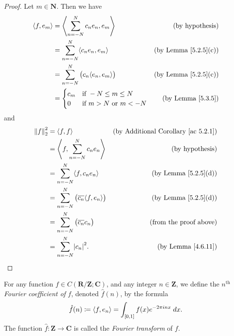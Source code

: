 \begin{proof}
    Let \(m \in \mathbf{N}\).
    Then we have
    \begin{align*}
        \inner*{f, e_m} & = \inner*{\sum_{n = -N}^N c_n e_n, e_m}           & \text{(by hypothesis)}           \\
                        & = \sum_{n = -N}^N \inner*{c_n e_n, e_m}           & \text{(by Lemma \ref{5.2.5}(c))} \\
                        & = \sum_{n = -N}^N \big(c_n \inner*{e_n, e_m}\big) & \text{(by Lemma \ref{5.2.5}(c))} \\
                        & = \begin{cases}
            c_m & \text{if } -N \leq m \leq N         \\
            0   & \text{if } m > N \text{ or } m < -N
        \end{cases}                      & \text{(by Lemma \ref{5.3.5})}
    \end{align*}
    and
    \begin{align*}
        \norm*{f}_2^2 & = \inner*{f, f}                                            & \text{(by Additional Corollary \ref{ac 5.2.1})} \\
                      & = \inner*{f, \sum_{n = -N}^N c_n e_n}                      & \text{(by hypothesis)}                          \\
                      & = \sum_{n = -N}^N \inner*{f, c_n e_n}                      & \text{(by Lemma \ref{5.2.5}(d))}                \\
                      & = \sum_{n = -N}^N \big(\overline{c_n} \inner*{f, e_n}\big) & \text{(by Lemma \ref{5.2.5}(d))}                \\
                      & = \sum_{n = -N}^N \big(\overline{c_n} c_n\big)             & \text{(from the proof above)}                   \\
                      & = \sum_{n = -N}^N \abs*{c_n}^2.                            & \text{(by Lemma \ref{4.6.11})}
    \end{align*}
\end{proof}

\begin{definition}\label{5.3.7}
    For any function \(f \in C(\mathbf{R} / \mathbf{Z} ; \mathbf{C})\), and any integer \(n \in \mathbf{Z}\), we define the \(n^{\text{th}}\) \emph{Fourier coefficient of} \(f\), denoted \(\hat{f}(n)\), by the formula
    \[
        \hat{f}(n) \coloneqq \inner*{f, e_n} = \int_{[0, 1]} f(x) e^{- 2 \pi i n x} \; dx.
    \]
    The function \(\hat{f} : \mathbf{Z} \to \mathbf{C}\) is called the \emph{Fourier transform} of \(f\).
\end{definition}

